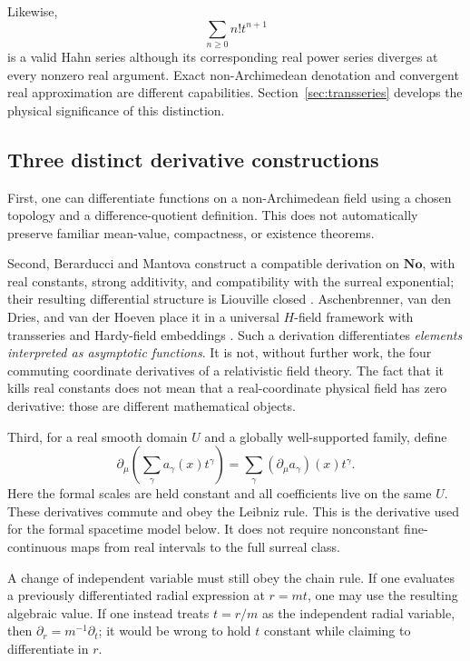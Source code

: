 \documentclass[11pt,a4paper]{article}
\numberwithin{equation}{section}
\theoremstyle{definition}
\theoremstyle{remark}
\newcommand{\No}{\mathbf{No}}
\begin{document}
Likewise,
\begin{equation}\label{eq:factorialseries}
 \sum_{n\geq0} n!t^{n+1}
\end{equation}
is a valid Hahn series although its corresponding real power series diverges at every nonzero real argument. Exact non-Archimedean denotation and convergent real approximation are different capabilities. Section~\ref{sec:transseries} develops the physical significance of this distinction.

\subsection{Three distinct derivative constructions}
First, one can differentiate functions on a non-Archimedean field using a chosen topology and a difference-quotient definition. This does not automatically preserve familiar mean-value, compactness, or existence theorems.

Second, Berarducci and Mantova construct a compatible derivation on $\No$, with real constants, strong additivity, and compatibility with the surreal exponential; their resulting differential structure is Liouville closed \cite{BM}. Aschenbrenner, van den Dries, and van der Hoeven place it in a universal $H$-field framework with transseries and Hardy-field embeddings \cite{ADH}. Such a derivation differentiates \emph{elements interpreted as asymptotic functions}. It is not, without further work, the four commuting coordinate derivatives of a relativistic field theory. The fact that it kills real constants does not mean that a real-coordinate physical field has zero derivative: those are different mathematical objects.

Third, for a real smooth domain $U$ and a globally well-supported family, define
\begin{equation}\label{eq:coefficientderivative}
 \partial_\mu\left(\sum_\gamma a_\gamma(x)t^\gamma\right)
 =\sum_\gamma (\partial_\mu a_\gamma)(x)t^\gamma.
\end{equation}
Here the formal scales are held constant and all coefficients live on the same $U$. These derivatives commute and obey the Leibniz rule. This is the derivative used for the formal spacetime model below. It does not require nonconstant fine-continuous maps from real intervals to the full surreal class.

A change of independent variable must still obey the chain rule. If one evaluates a previously differentiated radial expression at $r=mt$, one may use the resulting algebraic value. If one instead treats $t=r/m$ as the independent radial variable, then $\partial_r=m^{-1}\partial_t$; it would be wrong to hold $t$ constant while claiming to differentiate in $r$.
\end{document}

